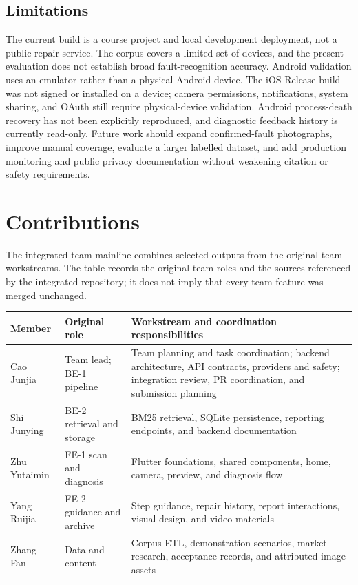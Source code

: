 \documentclass[10.5pt,a4paper]{article}
\begin{document}
\subsection{Limitations}

The current build is a course project and local development deployment, not a public repair service. The corpus covers a limited set of devices, and the present evaluation does not establish broad fault-recognition accuracy. Android validation uses an emulator rather than a physical Android device. The iOS Release build was not signed or installed on a device; camera permissions, notifications, system sharing, and OAuth still require physical-device validation. Android process-death recovery has not been explicitly reproduced, and diagnostic feedback history is currently read-only. Future work should expand confirmed-fault photographs, improve manual coverage, evaluate a larger labelled dataset, and add production monitoring and public privacy documentation without weakening citation or safety requirements.

\section{Contributions}

The integrated team mainline combines selected outputs from the original team workstreams. The table records the original team roles and the sources referenced by the integrated repository; it does not imply that every team feature was merged unchanged.

\begin{center}
\small
\begin{tabularx}{\textwidth}{p{25mm} p{34mm} X}
\toprule
\textbf{Member} & \textbf{Original role} & \textbf{Workstream and coordination responsibilities} \\
\midrule
Cao Junjia & Team lead; BE-1 pipeline & Team planning and task coordination; backend architecture, API contracts, providers and safety; integration review, PR coordination, and submission planning \\
Shi Junying & BE-2 retrieval and storage & BM25 retrieval, SQLite persistence, reporting endpoints, and backend documentation \\
Zhu Yutaimin & FE-1 scan and diagnosis & Flutter foundations, shared components, home, camera, preview, and diagnosis flow \\
Yang Ruijia & FE-2 guidance and archive & Step guidance, repair history, report interactions, visual design, and video materials \\
Zhang Fan & Data and content & Corpus ETL, demonstration scenarios, market research, acceptance records, and attributed image assets \\
\bottomrule
\end{tabularx}
\end{center}
\end{document}
